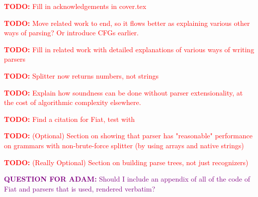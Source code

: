 \newcommand{\todo}[1]{\textcolor{red}{\textbf{TODO:} #1}}
\newcommand{\todoask}[1]{\textcolor{purple}{\textbf{QUESTION FOR ADAM:} #1}}

\todo{Fill in acknowledgements in cover.tex}

\todo{Move related work to end, so it flows better as explaining various other ways of parsing?  Or introduce CFGs earlier.}

\todo{Fill in related work with detailed explanations of various ways of writing parsers}

\todo{Splitter now returns numbers, not strings}

\todo{Explain how soundness can be done without parser extensionality, at the cost of algorithmic complexity elsewhere.}

\todo{Find a citation for Fiat, test with~\cite{fiat}}

\todo{(Optional) Section on showing that parser has "reasonable" performance on grammars with non-brute-force splitter (by using arrays and native strings)}

\todo{(Really Optional) Section on building parse trees, not just recognizers)}

\todoask{Should I include an appendix of all of the code of Fiat and parsers that is used, rendered verbatim?}

\cleardoublepage
{}

